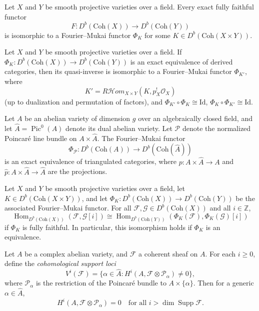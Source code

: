 \begin{theorem}
Let $X$ and $Y$ be smooth projective varieties over a field. Every exact fully faithful functor
$$
F: D^b(\mathrm{Coh}(X)) \to D^b(\mathrm{Coh}(Y))
$$
is isomorphic to a Fourier--Mukai functor $\Phi_K$ for some $K \in D^b(\mathrm{Coh}(X \times Y))$.
\end{theorem}

\begin{theorem}
Let $X$ and $Y$ be smooth projective varieties over a field. If $\Phi_K : D^b(\mathrm{Coh}(X)) \to D^b(\mathrm{Coh}(Y))$ is an exact equivalence of derived categories, then its quasi-inverse is isomorphic to a Fourier--Mukai functor $\Phi_{K'}$, where
$$
K' = R\mathcal{H}om_{X \times Y}(K, p_X^! \mathcal{O}_X)
$$
(up to dualization and permutation of factors), and $\Phi_{K'} \circ \Phi_K \cong \mathrm{Id}$, $\Phi_K \circ \Phi_{K'} \cong \mathrm{Id}$.
\end{theorem}


\begin{theorem}
Let $A$ be an abelian variety of dimension $g$ over an algebraically closed field, and let $\widehat{A} = \operatorname{Pic}^0(A)$ denote its dual abelian variety. Let $\mathcal{P}$ denote the normalized Poincar\'e line bundle on $A \times \widehat{A}$. The Fourier--Mukai functor
$$
\Phi_{\mathcal{P}}: D^b(\mathrm{Coh}(A)) \to D^b(\mathrm{Coh}(\widehat{A}))
$$
is an exact equivalence of triangulated categories, where $p: A\times \widehat{A} \to A$ and $\widehat{p} : A \times \widehat{A} \to \widehat{A}$ are the projections.
\end{theorem}

\begin{proposition}
Let $X$ and $Y$ be smooth projective varieties over a field, let $K \in D^b(\mathrm{Coh}(X \times Y))$, and let $\Phi_K: D^b(\mathrm{Coh}(X)) \to D^b(\mathrm{Coh}(Y))$ be the associated Fourier--Mukai functor. For all $\mathcal{F}, \mathcal{G} \in D^b(\mathrm{Coh}(X))$ and all $i \in \mathbb{Z}$,
$$
\operatorname{Hom}_{D^b(\mathrm{Coh}(X))}(\mathcal{F}, \mathcal{G}[i]) \cong \operatorname{Hom}_{D^b(\mathrm{Coh}(Y))}(\Phi_K(\mathcal{F}), \Phi_K(\mathcal{G})[i])
$$
if $\Phi_K$ is fully faithful. In particular, this isomorphism holds if $\Phi_K$ is an equivalence.
\end{proposition}

\begin{theorem}
Let $A$ be a complex abelian variety, and $\mathcal{F}$ a coherent sheaf on $A$. For each $i \geq 0$, define the \emph{cohomological support loci}
$$
V^i(\mathcal{F}) = \{ \alpha \in \widehat{A} : H^i(A, \mathcal{F} \otimes \mathcal{P}_\alpha) \neq 0 \},
$$
where $\mathcal{P}_\alpha$ is the restriction of the Poincar\'e bundle to $A \times \{\alpha\}$. Then for a generic $\alpha \in \widehat{A}$,
$$
H^i(A, \mathcal{F} \otimes \mathcal{P}_\alpha) = 0 \quad \text{for all } i > \dim \operatorname{Supp} \mathcal{F}.
$$
\end{theorem}

